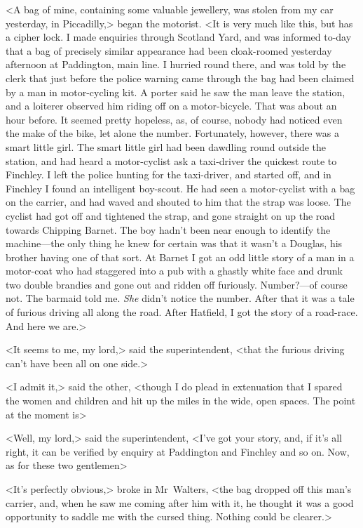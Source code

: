 <A bag of mine, containing some valuable jewellery, was stolen from my car yesterday, in Piccadilly,> began the motorist. <It is very much like this, but has a cipher lock. I made enquiries through Scotland Yard, and was informed to-day that a bag of precisely similar appearance had been cloak-roomed yesterday afternoon at Paddington, main line. I hurried round there, and was told by the clerk that just before the police warning came through the bag had been claimed by a man in motor-cycling kit. A porter said he saw the man leave the station, and a loiterer observed him riding off on a motor-bicycle. That was about an hour before. It seemed pretty hopeless, as, of course, nobody had noticed even the make of the bike, let alone the number. Fortunately, however, there was a smart little girl. The smart little girl had been dawdling round outside the station, and had heard a motor-cyclist ask a taxi-driver the quickest route to Finchley. I left the police hunting for the taxi-driver, and started off, and in Finchley I found an intelligent boy-scout. He had seen a motor-cyclist with a bag on the carrier, and had waved and shouted to him that the strap was loose. The cyclist had got off and tightened the strap, and gone straight on up the road towards Chipping Barnet. The boy hadn't been near enough to identify the machine—the only thing he knew for certain was that it wasn't a Douglas, his brother having one of that sort. At Barnet I got an odd little story of a man in a motor-coat who had staggered into a pub with a ghastly white face and drunk two double brandies and gone out and ridden off furiously. Number?—of course not. The barmaid told me. \emph{She} didn't notice the number. After that it was a tale of furious driving all along the road. After Hatfield, I got the story of a road-race. And here we are.>

<It seems to me, my lord,> said the superintendent, <that the furious driving can't have been all on one side.>

<I admit it,> said the other, <though I do plead in extenuation that I spared the women and children and hit up the miles in the wide, open spaces. The point at the moment is\longdash>

<Well, my lord,> said the superintendent, <I've got your story, and, if it's all right, it can be verified by enquiry at Paddington and Finchley and so on. Now, as for these two gentlemen\longdash>

<It's perfectly obvious,> broke in Mr~Walters, <the bag dropped off this man's carrier, and, when he saw me coming after him with it, he thought it was a good opportunity to saddle me with the cursed thing. Nothing could be clearer.>

